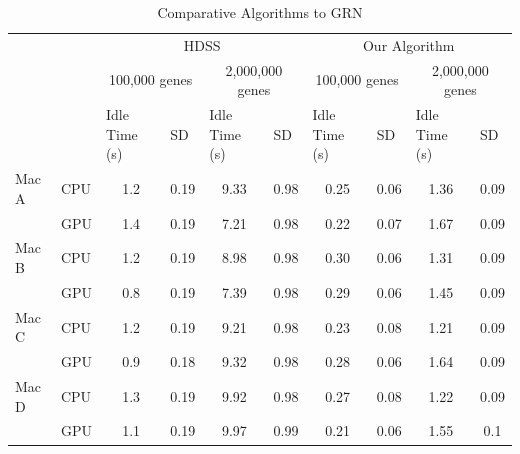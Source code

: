 \documentclass[journal]{IEEEtran}
\begin{document}
\begin{table}[htb]
\centering
\caption{Comparative Algorithms to GRN}
\begin{scriptsize}
\begin{tabular}{|l|l|l|l|l|l|l|l|l|l|}
\cline{3-10}
\multicolumn{1}{l}{} &  & \multicolumn{4}{c|}{HDSS} & \multicolumn{4}{c|}{Our Algorithm} \\ 
\cline{3-10}
\multicolumn{1}{l}{} &  & \multicolumn{2}{c|}{100,000 genes} & \multicolumn{2}{c|}{2,000,000 genes} & \multicolumn{2}{c|}{100,000 genes} & \multicolumn{2}{c|}{2,000,000 genes} \\ 
\cline{3-10}
\multicolumn{1}{l}{} &  & Idle Time (s) & SD & Idle Time (s) & SD & Idle Time (s) & SD & Idle Time (s) & SD \\ 
\hline
Mac A & CPU & \multicolumn{1}{c|}{1.2} & \multicolumn{1}{c|}{0.19} & \multicolumn{1}{c|}{9.33} & \multicolumn{1}{c|}{0.98} & \multicolumn{1}{c|}{0.25} & \multicolumn{1}{c|}{0.06} & \multicolumn{1}{c|}{1.36} & \multicolumn{1}{c|}{0.09} \\ 
\cline{2-10}
 & GPU & \multicolumn{1}{c|}{1.4} & \multicolumn{1}{c|}{0.19} & \multicolumn{1}{c|}{7.21} & \multicolumn{1}{c|}{0.98} & \multicolumn{1}{c|}{0.22} & \multicolumn{1}{c|}{0.07} & \multicolumn{1}{c|}{1.67} & \multicolumn{1}{c|}{0.09} \\ 
\hline
Mac B & CPU & \multicolumn{1}{c|}{1.2} & \multicolumn{1}{c|}{0.19} & \multicolumn{1}{c|}{8.98} & \multicolumn{1}{c|}{0.98} & \multicolumn{1}{c|}{0.30} & \multicolumn{1}{c|}{0.06} & \multicolumn{1}{c|}{1.31} & \multicolumn{1}{c|}{0.09} \\ 
\cline{2-10}
 & GPU & \multicolumn{1}{c|}{0.8} & \multicolumn{1}{c|}{0.19} & \multicolumn{1}{c|}{7.39} & \multicolumn{1}{c|}{0.98} & \multicolumn{1}{c|}{0.29} & \multicolumn{1}{c|}{0.06} & \multicolumn{1}{c|}{1.45} & \multicolumn{1}{c|}{0.09} \\ 
\hline
Mac C & CPU & \multicolumn{1}{c|}{1.2} & \multicolumn{1}{c|}{0.19} & \multicolumn{1}{c|}{9.21} & \multicolumn{1}{c|}{0.98} & \multicolumn{1}{c|}{0.23} & \multicolumn{1}{c|}{0.08} & \multicolumn{1}{c|}{1.21} & \multicolumn{1}{c|}{0.09} \\ 
\cline{2-10}
 & GPU & \multicolumn{1}{c|}{0.9} & \multicolumn{1}{c|}{0.18} & \multicolumn{1}{c|}{9.32} & \multicolumn{1}{c|}{0.98} & \multicolumn{1}{c|}{0.28} & \multicolumn{1}{c|}{0.06} & \multicolumn{1}{c|}{1.64} & \multicolumn{1}{c|}{0.09} \\ 
\hline
Mac D & CPU & \multicolumn{1}{c|}{1.3} & \multicolumn{1}{c|}{0.19} & \multicolumn{1}{c|}{9.92} & \multicolumn{1}{c|}{0.98} & \multicolumn{1}{c|}{0.27} & \multicolumn{1}{c|}{0.08} & \multicolumn{1}{c|}{1.22} & \multicolumn{1}{c|}{0.09} \\ 
\cline{2-10}
 & GPU & \multicolumn{1}{c|}{1.1} & \multicolumn{1}{c|}{0.19} & \multicolumn{1}{c|}{9.97} & \multicolumn{1}{c|}{0.99} & \multicolumn{1}{c|}{0.21} & \multicolumn{1}{c|}{0.06} & \multicolumn{1}{c|}{1.55} & \multicolumn{1}{c|}{0.1} \\ 
\hline
\end{tabular}
\end{scriptsize}
\label{table: ociosidadeGene}
\end{table}
\end{document}
